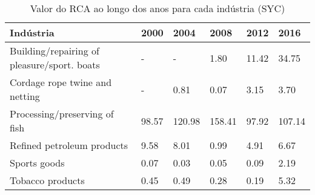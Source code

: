 \begin{table}
\centering
\caption{Valor do RCA ao longo dos anos para cada indústria (SYC)}
\begin{tabular}{p{6cm}p{1.5cm}p{1.5cm}p{1.5cm}p{1.5cm}p{1.5cm}}
\toprule
                                  Indústria &  2000 &   2004 &   2008 &  2012 &   2016 \\
\midrule
Building/repairing of pleasure/sport. boats &     - &      - &   1.80 & 11.42 &  34.75 \\
             Cordage rope twine and netting &     - &   0.81 &   0.07 &  3.15 &   3.70 \\
              Processing/preserving of fish & 98.57 & 120.98 & 158.41 & 97.92 & 107.14 \\
                 Refined petroleum products &  9.58 &   8.01 &   0.99 &  4.91 &   6.67 \\
                               Sports goods &  0.07 &   0.03 &   0.05 &  0.09 &   2.19 \\
                           Tobacco products &  0.45 &   0.49 &   0.28 &  0.19 &   5.32 \\
\bottomrule
\end{tabular}
\end{table}
